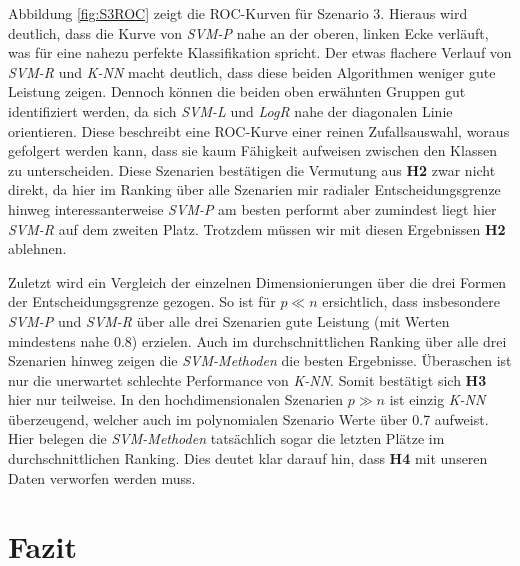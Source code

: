 \documentclass[
]{article}
\begin{document}
Abbildung \ref{fig:S3ROC} zeigt die ROC-Kurven für Szenario 3. Hieraus
wird deutlich, dass die Kurve von \textit{SVM-P} nahe an der oberen,
linken Ecke verläuft, was für eine nahezu perfekte Klassifikation
spricht. Der etwas flachere Verlauf von \textit{SVM-R} und \textit{K-NN}
macht deutlich, dass diese beiden Algorithmen weniger gute Leistung
zeigen. Dennoch können die beiden oben erwähnten Gruppen gut
identifiziert werden, da sich \textit{SVM-L} und \textit{LogR} nahe der
diagonalen Linie orientieren. Diese beschreibt eine ROC-Kurve einer
reinen Zufallsauswahl, woraus gefolgert werden kann, dass sie kaum
Fähigkeit aufweisen zwischen den Klassen zu unterscheiden. Diese
Szenarien bestätigen die Vermutung aus \textbf{H2} zwar nicht direkt, da
hier im Ranking über alle Szenarien mir radialer Entscheidungsgrenze
hinweg interessanterweise \textit{SVM-P} am besten performt aber
zumindest liegt hier \textit{SVM-R} auf dem zweiten Platz. Trotzdem
müssen wir mit diesen Ergebnissen \textbf{H2} ablehnen.

Zuletzt wird ein Vergleich der einzelnen Dimensionierungen über die drei
Formen der Entscheidungsgrenze gezogen. So ist für \(p \ll n\)
ersichtlich, dass insbesondere \textit{SVM-P} und \textit{SVM-R} über
alle drei Szenarien gute Leistung (mit Werten mindestens nahe 0.8)
erzielen. Auch im durchschnittlichen Ranking über alle drei Szenarien
hinweg zeigen die \textit{SVM-Methoden} die besten Ergebnisse.
Überaschen ist nur die unerwartet schlechte Performance von
\textit{K-NN}. Somit bestätigt sich \textbf{H3} hier nur teilweise. In
den hochdimensionalen Szenarien \(p \gg n\) ist einzig \textit{K-NN}
überzeugend, welcher auch im polynomialen Szenario Werte über 0.7
aufweist. Hier belegen die \textit{SVM-Methoden} tatsächlich sogar die
letzten Plätze im durchschnittlichen Ranking. Dies deutet klar darauf
hin, dass \textbf{H4} mit unseren Daten verworfen werden muss.

\section{Fazit}
\end{document}
